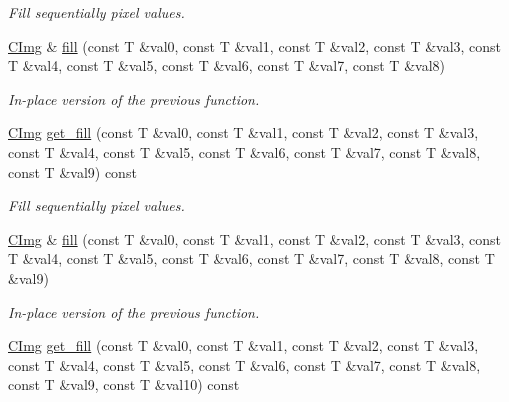 \begin{DoxyCompactItemize}
\begin{DoxyCompactList}\small\item\em Fill sequentially pixel values. \end{DoxyCompactList}\item 
\hypertarget{structcimg__library_1_1_c_img_ad6e690a3d3ef39d3a87a5832e33cf45f}{\hyperlink{structcimg__library_1_1_c_img}{C\-Img} \& \hyperlink{structcimg__library_1_1_c_img_ad6e690a3d3ef39d3a87a5832e33cf45f}{fill} (const T \&val0, const T \&val1, const T \&val2, const T \&val3, const T \&val4, const T \&val5, const T \&val6, const T \&val7, const T \&val8)}\label{structcimg__library_1_1_c_img_ad6e690a3d3ef39d3a87a5832e33cf45f}

\begin{DoxyCompactList}\small\item\em In-\/place version of the previous function. \end{DoxyCompactList}\item 
\hypertarget{structcimg__library_1_1_c_img_ab4ad1daeca241dd2fd9f7074a3385867}{\hyperlink{structcimg__library_1_1_c_img}{C\-Img} \hyperlink{structcimg__library_1_1_c_img_ab4ad1daeca241dd2fd9f7074a3385867}{get\-\_\-fill} (const T \&val0, const T \&val1, const T \&val2, const T \&val3, const T \&val4, const T \&val5, const T \&val6, const T \&val7, const T \&val8, const T \&val9) const }\label{structcimg__library_1_1_c_img_ab4ad1daeca241dd2fd9f7074a3385867}

\begin{DoxyCompactList}\small\item\em Fill sequentially pixel values. \end{DoxyCompactList}\item 
\hypertarget{structcimg__library_1_1_c_img_a78959e122bf52f3baa2ac57f7ee6d654}{\hyperlink{structcimg__library_1_1_c_img}{C\-Img} \& \hyperlink{structcimg__library_1_1_c_img_a78959e122bf52f3baa2ac57f7ee6d654}{fill} (const T \&val0, const T \&val1, const T \&val2, const T \&val3, const T \&val4, const T \&val5, const T \&val6, const T \&val7, const T \&val8, const T \&val9)}\label{structcimg__library_1_1_c_img_a78959e122bf52f3baa2ac57f7ee6d654}

\begin{DoxyCompactList}\small\item\em In-\/place version of the previous function. \end{DoxyCompactList}\item 
\hypertarget{structcimg__library_1_1_c_img_af87a85f35f2c37d1f9f5ed827678d5e2}{\hyperlink{structcimg__library_1_1_c_img}{C\-Img} \hyperlink{structcimg__library_1_1_c_img_af87a85f35f2c37d1f9f5ed827678d5e2}{get\-\_\-fill} (const T \&val0, const T \&val1, const T \&val2, const T \&val3, const T \&val4, const T \&val5, const T \&val6, const T \&val7, const T \&val8, const T \&val9, const T \&val10) const }\label{structcimg__library_1_1_c_img_af87a85f35f2c37d1f9f5ed827678d5e2}


\end{DoxyCompactItemize}
